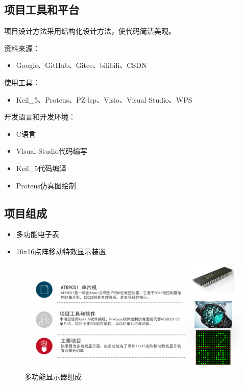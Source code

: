 \documentclass{textreportclass}  %
\begin{document}
	
	
	\subsection{项目工具和平台}			   %
	项目设计方法采用结构化设计方法，使代码简洁美观。
	
	资料来源：
	\begin{itemize}
		\item Google、GitHub、Gitee、bilibili、CSDN
	\end{itemize}
	
	使用工具：
	\begin{itemize}    
		\item Keil\_5、Proteus、PZ-lsp、Visio、Visual Studio、WPS
	\end{itemize}
	
	开发语言和开发环境：
	\begin{itemize}
		\item C语言
		\item Visual Studio代码编写
		\item Keil\_5代码编译
		\item Proteus仿真图绘制
	\end{itemize}
	
	\subsection{项目组成}			       %
	\begin{itemize}
		\item 多功能电子表
		\item 16x16点阵移动特效显示装置
	\end{itemize}
	\begin{figure}[htbp]
		\centering
		\includegraphics[scale=0.4]{Fig/简介.PNG}
		\caption{多功能显示器组成}\label{Fig.5}
	\end{figure}
	
\end{document}
